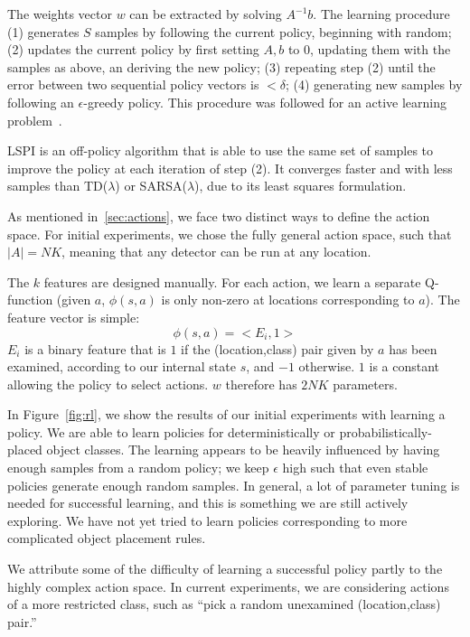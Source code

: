 The weights vector $w$ can be extracted by solving $A^{-1}b$.
The learning procedure (1) generates $S$ samples by following the current policy, beginning with random; (2) updates the current policy by first setting $A,b$ to $0$, updating them with the samples as above, an deriving the new policy; (3) repeating step (2) until the error between two sequential policy vectors is $< \delta$; (4) generating new samples by following an $\epsilon$-greedy policy.
This procedure was followed for an active learning problem~\cite{Kwok2004}.

LSPI is an off-policy algorithm that is able to use the same set of samples to improve the policy at each iteration of step (2).
It converges faster and with less samples than TD($\lambda$) or SARSA($\lambda$), due to its least squares formulation.

As mentioned in~\autoref{sec:actions}, we face two distinct ways to define the action space.
For initial experiments, we chose the fully general action space, such that $|A| = NK$, meaning that any detector can be run at any location.

The $k$ features are designed manually.
For each action, we learn a separate Q-function (given $a$, $\phi(s,a)$ is only non-zero at locations corresponding to $a$).
The feature vector is simple:
\begin{equation}
  \phi(s,a) = <E_i, 1>
\end{equation}
$E_i$ is a binary feature that is $1$ if the (location,class) pair given by $a$ has been examined, according to our internal state $s$, and $-1$ otherwise.
$1$ is a constant allowing the policy to select actions.
$w$ therefore has $2NK$ parameters.


In Figure~\ref{fig:rl}, we show the results of our initial experiments with learning a policy. We are able to learn policies for deterministically or probabilistically-placed object classes.
The learning appears to be heavily influenced by having enough samples from a random policy; we keep $\epsilon$ high such that even stable policies generate enough random samples.
In general, a lot of parameter tuning is needed for successful learning, and this is something we are still actively exploring.
We have not yet tried to learn policies corresponding to more complicated object placement rules.

We attribute some of the difficulty of learning a successful policy partly to the highly complex action space.
In current experiments, we are considering actions of a more restricted class, such as ``pick a random unexamined (location,class) pair.''